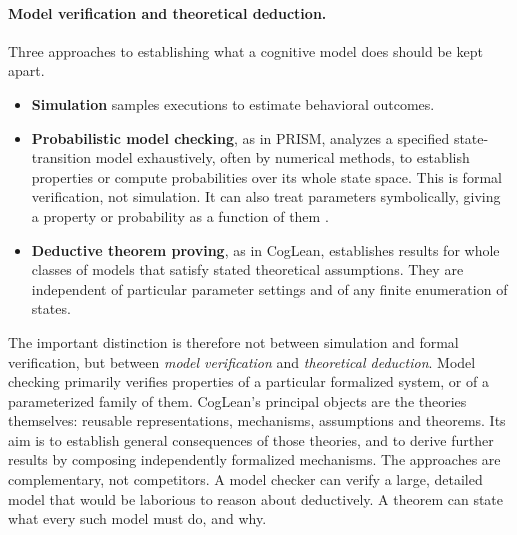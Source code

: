 \documentclass[11pt]{article}
\begin{document}
\paragraph{Model verification and theoretical deduction.} Three approaches to establishing what a cognitive model does should be kept apart.
\begin{itemize}
  \item \textbf{Simulation} samples executions to estimate behavioral outcomes.
  \item \textbf{Probabilistic model checking}, as in PRISM, analyzes a specified state-transition model exhaustively, often by numerical methods, to establish properties or compute probabilities over its whole state space. This is formal verification, not simulation. It can also treat parameters symbolically, giving a property or probability as a function of them \citep{hahn2011}.
  \item \textbf{Deductive theorem proving}, as in CogLean, establishes results for whole classes of models that satisfy stated theoretical assumptions. They are independent of particular parameter settings and of any finite enumeration of states.
\end{itemize}
The important distinction is therefore not between simulation and formal verification, but between \emph{model verification} and \emph{theoretical deduction}. Model checking primarily verifies properties of a particular formalized system, or of a parameterized family of them. CogLean's principal objects are the theories themselves: reusable representations, mechanisms, assumptions and theorems. Its aim is to establish general consequences of those theories, and to derive further results by composing independently formalized mechanisms. The approaches are complementary, not competitors. A model checker can verify a large, detailed model that would be laborious to reason about deductively. A theorem can state what every such model must do, and why.
\end{document}
